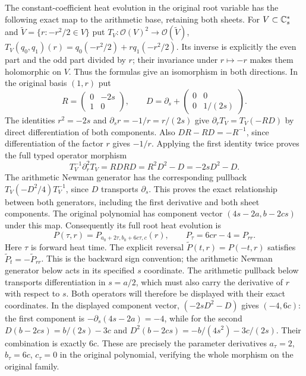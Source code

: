 The constant-coefficient heat evolution in the original root variable
has the following exact map to the arithmetic base, retaining both sheets.
For $V\subset\mathbb C_s^*$ and
$\widetilde V=\{r:-r^2/2\in V\}$ put
$T_V:\mathcal O(V)^2\to\mathcal O(\widetilde V)$,
$T_V(q_0,q_1)(r)=q_0(-r^2/2)+rq_1(-r^2/2)$.
Its inverse is explicitly the even part and the odd part divided by $r$;
their invariance under $r\mapsto-r$ makes them holomorphic on $V$.
Thus the formulas give an isomorphism in both directions. In the
original basis $(1,r)$ put
\[
R=\begin{pmatrix}0&-2s\\1&0\end{pmatrix},\qquad
D=\partial_s+\begin{pmatrix}0&0\\0&1/(2s)\end{pmatrix}.
\]
The identities $r^2=-2s$ and $\partial_s r=-1/r=r/(2s)$ give
$\partial_rT_V=T_V(-RD)$ by direct differentiation of both
components. Also $DR-RD=-R^{-1}$, since differentiation of the
factor $r$ gives $-1/r$. Applying the first identity twice proves
the full typed operator morphism
\[
T_V^{-1}\partial_r^2T_V
=RDRD=R^2D^2-D=-2sD^2-D.
\]
The arithmetic Newman generator has the corresponding pullback
$T_V(-D^2/4)T_V^{-1}$, since $D$ transports $\partial_s$.
This proves the exact relationship between both generators, including
the first derivative and both sheet components. The original polynomial
has component vector $(4s-2a,b-2cs)$ under this map. Consequently its
full root heat evolution is
\[
P(\tau,r)=P_{a_0+2\tau,b_0+6c\tau,c}(r),\qquad
P_\tau=6cr-4=P_{rr}.
\]
Here $\tau$ is forward heat time. The explicit reversal
$\widetilde P(t,r)=P(-t,r)$ satisfies
$\widetilde P_t=-\widetilde P_{rr}$. This is the backward sign convention;
the arithmetic Newman generator below acts in its specified $s$ coordinate.
The arithmetic pullback below transports differentiation in $s=a/2$,
which must also carry the derivative of $r$ with respect to $s$.
Both operators will therefore be displayed with their exact coordinates.
In the displayed component vector, $(-2sD^2-D)$ gives $(-4,6c)$:
the first component is $-\partial_s(4s-2a)=-4$, while for the
second $D(b-2cs)=b/(2s)-3c$ and
$D^2(b-2cs)=-b/(4s^2)-3c/(2s)$.
Their combination is exactly $6c$. These are precisely the parameter
derivatives $a_\tau=2$, $b_\tau=6c$, $c_\tau=0$ in the original
polynomial, verifying the whole morphism on the original family.

